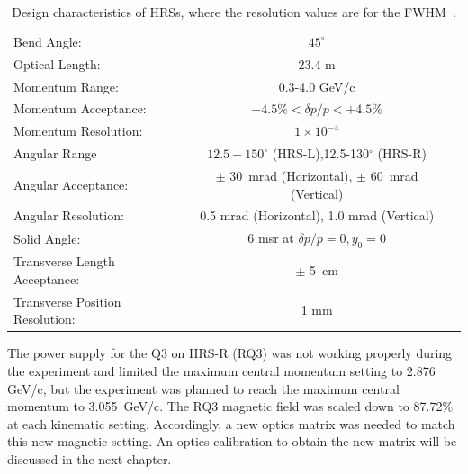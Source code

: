  \begin{table}[htbp]
   \begin{tabular}{lcc}
   \toprule
   Bend Angle:           &$45^{\circ}$    \\   
   Optical Length:       &23.4 m      \\
   Momentum Range:       &0.3-4.0 GeV/c \\
   Momentum Acceptance:  &$-4.5\%<\delta p/p<+4.5\%$ \\
   Momentum Resolution:  &$1\times 10^{-4}$ \\
   Angular Range         &$12.5-150^{\circ}$ (HRS-L),12.5-130$^{\circ}$ (HRS-R) \\
   Angular Acceptance:   &$\pm$ 30~mrad (Horizontal), $\pm$ 60~mrad (Vertical)\\
   Angular Resolution:   &0.5 mrad (Horizontal), 1.0 mrad (Vertical)\\
   Solid Angle:          & 6 msr at $\delta p/p=0,y_{0}=0$\\
   Transverse Length Acceptance: &$\pm$ 5~cm \\
   Transverse Position Resolution: & 1 mm\\
   \bottomrule
   \end{tabular}
  \caption[Design characteristics of HRSs]{\footnotesize{Design characteristics of HRSs, where the resolution values are for the FWHM~\cite{halla_nim}.}}
  \label{hrs_table}
  \end{table}

 The power supply for the Q3 on HRS-R (RQ3) was not working properly during the experiment and limited the maximum central momentum setting to 2.876 GeV/c, but the experiment was planned to reach the maximum central momentum to 3.055~GeV/c. The RQ3 magnetic field was scaled down to 87.72\% at each kinematic setting. Accordingly, a new optics matrix was needed to match this new magnetic setting. An optics calibration to obtain the new matrix will be discussed in the next chapter.




